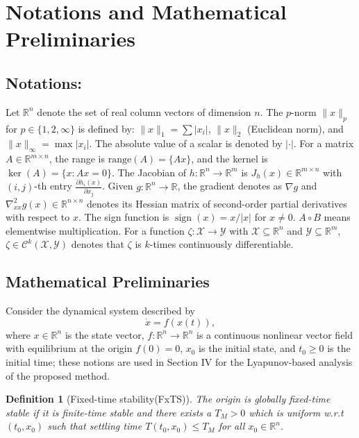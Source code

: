 \documentclass[letterpaper, 10 pt, conference]{ieeeconf}
\newtheorem{definition}{Definition}
\begin{document}
\section{Notations and Mathematical Preliminaries}
\subsection{Notations:}
Let $\mathbb{R}^n$ denote the set of real column vectors of dimension $n$. The $p$-norm $\|x\|_p$ for $p \in \{1,2,\infty\}$ is defined by: $\|x\|_1 = \sum |x_i|$, $\|x\|_2$ (Euclidean norm), and $\|x\|_\infty = \max |x_i|$. The absolute value of a scalar is denoted by $|\cdot|$. For a matrix $A \in \mathbb{R}^{m \times n}$, the range is $\mathrm{range}(A) = \{Ax\}$, and the kernel is $\ker(A) = \{x : Ax = 0\}$. The Jacobian of $h:\mathbb{R}^n\to\mathbb{R}^m$ is $J_h(x)\in\mathbb{R}^{m\times n}$ with $(i,j)$-th entry $\frac{\partial h_i(x)}{\partial x_j}$. Given $g:\mathbb{R}^n\to\mathbb{R}$, the gradient denotes as $\nabla g$ and $\nabla^2_{xx} g(x)\in\mathbb{R}^{n\times n}$ denotes its Hessian matrix of second-order partial derivatives with respect to $x$. The sign function is $\operatorname{sign}(x) = x/|x|$ for $x \neq 0$. $A \circ B$ means elementwise multiplication. For a function $\zeta:\mathcal{X}\to\mathcal{Y}$ with $\mathcal{X}\subseteq\mathbb{R}^n$ and $\mathcal{Y}\subseteq\mathbb{R}^m$, $\zeta \in \mathcal{C}^k(\mathcal{X},\mathcal{Y})$ denotes that $\zeta$ is $k$-times continuously differentiable. 
\subsection{Mathematical Preliminaries} 
Consider the dynamical system described by
\begin{equation}\label{1}
    \dot{x} = f(x(t)),
\end{equation}
where $x \in \mathbb{R}^n$ is the state vector, $f: \mathbb{R}^n \to  \mathbb{R}^n$ is a continuous nonlinear vector field with equilibrium at the origin $f(0)=0$, $x_0$ is the initial state, and $t_0 \ge 0$ is the initial time; these notions are used in Section IV for the Lyapunov-based analysis of the proposed method.

\begin{definition}[Fixed-time stability(FxTS)] \cite{polyakov_fix}
The origin is globally fixed-time stable if it is finite-time stable and there exists a $T_M>0$ which is uniform w.r.t $(t_0,x_0)$ such that settling time $T(t_0,x_0)\le T_M$ for all $x_0 \in \mathbb{R}^n$.
\end{definition}
\end{document}
